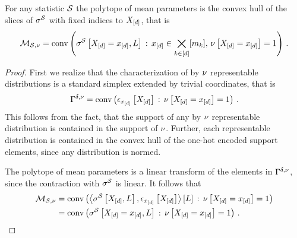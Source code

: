 \begin{theorem}
    \label{the:meanPolytopeConvHull}
    For any statistic $\mathcal{S}$ the polytope of mean parameters is the convex hull of the slices of $\sigma^{\mathcal{S}}$ with fixed indices to $X_{[d]}$, that is
    \begin{align*}
        \mathcal{M}_{\mathcal{S},\nu}
        = \mathrm{conv}\left(\sigma^{\mathcal{S}}\left[X_{[d]}=x_{[d]},L\right]\,:\,x_{[d]}\in\bigtimes_{k\in[d]}[m_{k}],\,\nu\left[X_{[d]}=x_{[d]}\right]=1\right) \, .
    \end{align*}
\end{theorem}
\begin{proof}
    First we realize that the characterization of by $\nu$ representable distributions is a standard simplex extended by trivial coordinates, that is
    \begin{align*}
        \Gamma^{\delta,\nu}
        = \mathrm{conv}\left(\epsilon_{x_{[d]}}\left[X_{[d]}\right]\,:\,\nu\left[X_{[d]}=x_{[d]}\right]=1 \right) \, .
    \end{align*}
    This follows from the fact, that the support of any by $\nu$ representable distribution is contained in the support of $\nu$.
    Further, each representable distribution is contained in the convex hull of the one-hot encoded support elements, since any distribution is normed.

    The polytope of mean parameters is a linear transform of the elements in $\Gamma^{\delta,\nu}$, since the contraction with $\sigma^{\mathcal{S}}$ is linear.
    It follows that
    \begin{align*}
        \mathcal{M}_{\mathcal{S},\nu}
        &= \mathrm{conv}\left(\left\langle \sigma^{\mathcal{S}}\left[X_{[d]},L\right],\epsilon_{x_{[d]}}\left[X_{[d]}\right]\right\rangle \left[ L \right] \, : \, \nu\left[X_{[d]}=x_{[d]}\right]=1 \right) \\
        &= \mathrm{conv}\left(\sigma^{\mathcal{S}}\left[X_{[d]}=x_{[d]},L\right] \, : \, \nu\left[X_{[d]}=x_{[d]}\right]=1\right) \, .
    \end{align*}
\end{proof}

